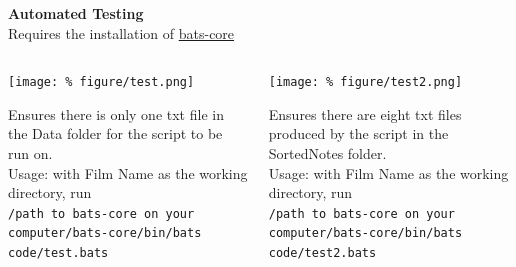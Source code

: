 \documentclass[unknownkeysallowed,usepdftitle=false, parskip=full]{beamer}
\newcommand{\secvariable}{nothing}
\newcommand{\mysection}[1]{\renewcommand{\secvariable}{#1}
}
\begin{document}
\mysection{major}
\begin{frame}\label{\secvariable} %
\begin{center}
  \vspace{-0.5cm}
\textbf{Automated Testing}\\
\vspace{2pt}
\footnotesize{Requires the installation of \href{https://github.com/bats-core/bats-core}{bats-core}}\\
\end{center}

 \begin{columns}[t]
  
 
  
      \begin{column}[c]{0.45\textwidth}
    {
    
\texttt{[image: \%
figure/test.png]}\\

\vspace{2pt}

\begin{center}
\tiny{
Ensures there is only one txt file in the Data folder for the script to be run on.\\
Usage: with Film Name as the working directory, run\\
\texttt{/path to bats-core on your computer/bats-core/bin/bats code/test.bats}
}
\end{center}

      }
    \end{column}
  
  \begin{column}[c]{0.45\textwidth}

\texttt{[image: \%
figure/test2.png]}

\vspace{2pt}

\begin{center}
\tiny{
Ensures there are eight txt files produced by the script in the Sorted\textunderscore Notes folder.\\
Usage: with Film Name as the working directory, run\\
\texttt{/path to bats-core on your computer/bats-core/bin/bats code/test2.bats}
}
\end{center}
      
    \end{column}
    
  \end{columns}
\end{frame}
\end{document}
